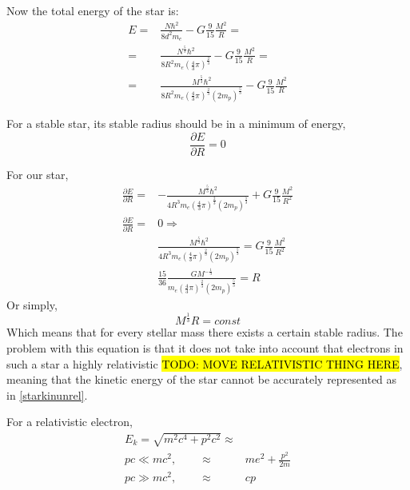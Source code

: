 			Now the total energy of the star is:
			\begin{align}
				E =& \frac{N\hbar^2}{8d^2m_e} -G \frac{9}{15} \frac{M^2}{R} = \\
				=& \frac{N^{\frac{5}{3}}\hbar^2}{8R^2m_e(\frac{4}{3}\pi)^{\frac{2}{3}}} -G \frac{9}{15} \frac{M^2}{R} = \\
				=& \frac{M^{\frac{5}{3}}\hbar^2}{8R^2m_e(\frac{4}{3}\pi)^{\frac{2}{3}}(2m_p)^{\frac{5}{3}}} -G \frac{9}{15} \frac{M^2}{R}
			\end{align}
			
			For a stable star, its stable radius should be in a minimum of energy,
			\begin{equation}
				\frac{\partial E}{\partial R} = 0
			\end{equation}
			
			For our star,
			\begin{align}
				\frac{\partial E}{\partial R} =& - \frac{M^{\frac{5}{3}}\hbar^2}{4R^3m_e(\frac{4}{3}\pi)^{\frac{2}{3}}(2m_p)^{\frac{5}{3}}} + G \frac{9}{15} \frac{M^2}{R^2} \\
				\frac{\partial E}{\partial R} =& 0 \Rightarrow \\
				&\frac{M^{\frac{5}{3}}\hbar^2}{4R^3m_e(\frac{4}{3}\pi)^{\frac{2}{3}}(2m_p)^{\frac{5}{3}}} = G \frac{9}{15} \frac{M^2}{R^2} \\
				&\frac{15}{36}\frac{GM^{-\frac{1}{3}}}{m_e(\frac{4}{3}\pi)^{\frac{2}{3}}(2m_p)^{\frac{5}{3}}} = R
			\end{align}
			Or simply, 
			\begin{equation}
				M^{\frac{1}{3}} R = const
				\label{unrelsize}
			\end{equation}
			Which means that for every stellar mass there exists a certain stable radius. The problem with this equation is that it does not take into account that electrons in such a star a highly relativistic \hl{TODO: MOVE RELATIVISTIC THING HERE}, meaning that the kinetic energy of the star cannot be accurately represented as in \ref{starkinunrel}. 	
			
			For a relativistic electron, 
			\begin{align}
				E_k = \sqrt{m^2c^4+p^2c^2} \approx& \\
				pc \ll mc^2, \qquad \approx& me^2 + \frac{p^2}{2m} \\
				pc \gg mc^2, \qquad \approx& cp
			\end{align}
			
